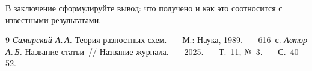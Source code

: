 \documentclass[12pt, a4paper]{article}
\theoremstyle{plain}
\begin{document}
В заключение сформулируйте вывод: что получено и как это соотносится
с известными результатами.

\vspace{0.8em}

\begin{thebibliography}{9}
  \footnotesize
   \emph{Самарский А.\,А.} Теория разностных схем.~---
    М.: Наука, 1989.~--- 616~с.
   \emph{Автор А.\,Б.} Название статьи~// Название журнала.~---
    2025.~--- Т.~11, №~3.~--- С.~40--52.
\end{thebibliography}
\end{document}
